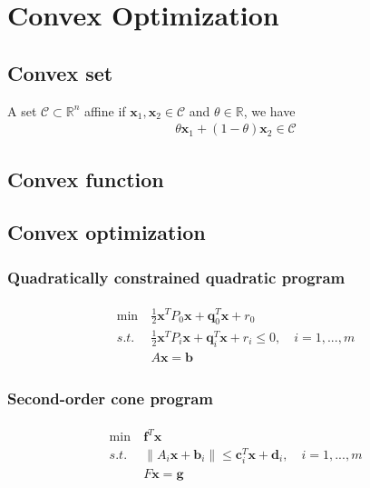\chapter{Convex Optimization}
\vspace{1em}
\section{Convex set}
\begin{definition}
    A set $\mathcal{C} \subset \mathbb{R}^n$ affine
    if $\mathbf{x}_1, \mathbf{x}_2 \in \mathcal{C}$
    and $\theta \in \mathbb{R}$, we have
    \begin{align}
        \theta \mathbf{x}_1 + 
        (1 - \theta)\mathbf{x}_2
        \in \mathcal{C}
    \end{align}
\end{definition}
\section{Convex function}
\section{Convex optimization}
\subsection{Quadratically constrained quadratic program}
\begin{align}
    \begin{array}{lll}
        \min \ &\frac{1}{2} \mathbf{x}^T P_0 \mathbf{x}
        + \mathbf{q}_0^T \mathbf{x} + r_0 \\
        s.t. \ &\frac{1}{2} \mathbf{x}^T P_i \mathbf{x}
        + \mathbf{q}_i^T \mathbf{x} + r_i \leq 0, \quad i = 1,...,m \\
        & A \mathbf{x} = \mathbf{b}
    \end{array}
\end{align}


\par
\subsection{Second-order cone program}
\begin{align}
    \begin{array}{lll}
        \min \ & \mathbf{f}^T \mathbf{x} \\
        s.t. \ & \parallel A_i \mathbf{x} + \mathbf{b}_i \parallel
        \leq \mathbf{c}_i^T\mathbf{x} + \mathbf{d}_i, \quad i = 1,...,m \\
        & F\mathbf{x} = \mathbf{g}
    \end{array}
\end{align}

